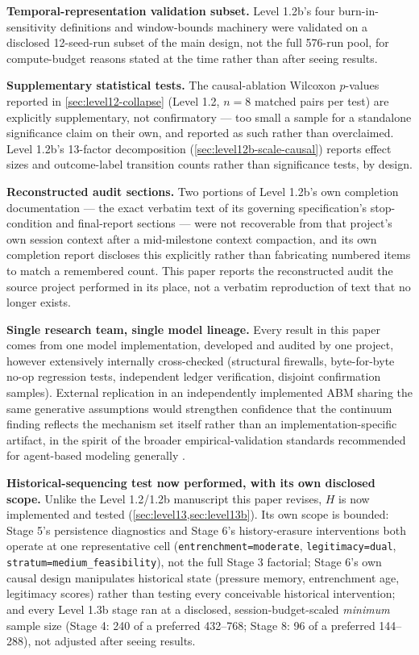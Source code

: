 \textbf{Temporal-representation validation subset.} Level 1.2b's four
burn-in-sensitivity definitions and window-bounds machinery were validated
on a disclosed 12-seed-run subset of the main design, not the full 576-run
pool, for compute-budget reasons stated at the time rather than after
seeing results.

\textbf{Supplementary statistical tests.} The causal-ablation Wilcoxon
$p$-values reported in \cref{sec:level12-collapse} (Level 1.2, $n=8$
matched pairs per test) are explicitly supplementary, not confirmatory ---
too small a sample for a standalone significance claim on their own, and
reported as such rather than overclaimed. Level 1.2b's 13-factor
decomposition (\cref{sec:level12b-scale-causal}) reports effect sizes and
outcome-label transition counts rather than significance tests, by design.

\textbf{Reconstructed audit sections.} Two portions of Level 1.2b's own
completion documentation --- the exact verbatim text of its governing
specification's stop-condition and final-report sections --- were not
recoverable from that project's own session context after a mid-milestone
context compaction, and its own completion report discloses this
explicitly rather than fabricating numbered items to match a remembered
count. This paper reports the reconstructed audit the source project
performed in its place, not a verbatim reproduction of text that no
longer exists.

\textbf{Single research team, single model lineage.} Every result in this
paper comes from one model implementation, developed and audited by one
project, however extensively internally cross-checked (structural
firewalls, byte-for-byte no-op regression tests, independent ledger
verification, disjoint confirmation samples). External replication in an
independently implemented ABM sharing the same generative assumptions
would strengthen confidence that the continuum finding reflects the
mechanism set itself rather than an implementation-specific artifact, in
the spirit of the broader empirical-validation standards recommended for
agent-based modeling generally \parencite{windrum2007empirical}.

\textbf{Historical-sequencing test now performed, with its own disclosed
scope.} Unlike the Level 1.2/1.2b manuscript this paper revises, $H$ is now
implemented and tested (\cref{sec:level13,sec:level13b}). Its own scope is
bounded: Stage 5's persistence diagnostics and Stage 6's history-erasure
interventions both operate at one representative cell
(\texttt{entrenchment=moderate}, \texttt{legitimacy=dual},
\texttt{stratum=medium\_feasibility}), not the full Stage 3 factorial;
Stage 6's own causal design manipulates historical state (pressure memory,
entrenchment age, legitimacy scores) rather than testing every conceivable
historical intervention; and every Level 1.3b stage ran at a disclosed,
session-budget-scaled \textit{minimum} sample size (Stage 4: 240 of a
preferred 432--768; Stage 8: 96 of a preferred 144--288), not adjusted
after seeing results.

